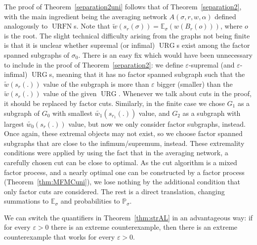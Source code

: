 \documentclass[12pt,a4paper]{article}
\newcommand{\eps}{\varepsilon}
\renewcommand{\:}{\colon}
\DeclareMathOperator{\URG}{URG}
\DeclareMathOperator{\URN}{URFN}
\begin{document}
The proof of Theorem~\ref{separation2uni} follows that of Theorem~\ref{separation2}, with the main ingredient being the averaging network $A(\sigma, r, w, \alpha)$ defined analogously to $\URN$s. 
Note that $\tilde{w}(s_r(\sigma)) = \mathbb{E}_\sigma(w(B_r(o)))$, where $o$ is the root. 
The slight technical difficulty arising from the graphs not being finite is that it is unclear whether supremal (or infimal) $\URG$s exist among the factor spanned subgraphs of $\sigma_0$. 
There is an easy fix which would have been unnecessary to include in the proof of Theorem~\ref{separation2}: we define $\eps$-supremal (and $\eps$-infimal) $\URG$s, meaning that it has no factor spanned subgraph such that the $\tilde{w}(s_r(.))$ value of the subgraph is more than $\eps$ bigger (smaller) than the $\tilde{w}(s_r(.))$ value of the given $\URG$. 
Whenever we talk about cuts in the proof, it should be replaced by factor cuts. 
Similarly, in the finite case we chose $G_1$ as a subgraph of $G_0$ with smallest $\tilde{w_1}(s_{r_1}(.))$ value, and $G_2$ as a subgraph with largest $\tilde{w_0}(s_r(.))$ value, but now we only consider factor subgraphs, instead. 
Once again, these extremal objects may not exist, so we choose factor spanned subgraphs that are close to the infimum/supremum, instead. 
These extremality conditions were applied by using the fact that in the averaging network, a carefully chosen cut can be close to optimal. 
As the cut algorithm is a mixed factor process, and a nearly optimal one can be constructed by a factor process (Theorem~\ref{thm:MFMCuni}), we lose nothing by the additional condition that only factor cuts are considered. 
The rest is a direct translation, changing summations to $\mathbb{E}_\sigma$ and probabilities to $\mathbb{P}_\sigma$. 

We can switch the quantifiers in Theorem~\ref{thm:strAL} in an advantageous way: if for every $\varepsilon>0$ there is an extreme counterexample, then there is an extreme counterexample that works for every $\varepsilon>0$. 
\end{document}
